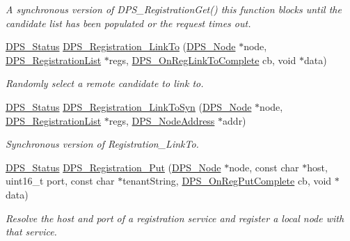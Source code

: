 \begin{DoxyCompactItemize}
\begin{DoxyCompactList}\small\item\em A synchronous version of D\+P\+S\+\_\+\+Registration\+Get() this function blocks until the candidate list has been populated or the request times out. \end{DoxyCompactList}\item 
\hyperlink{group__status_ga30395a84d3cad9d4ec29848106415038}{D\+P\+S\+\_\+\+Status} \hyperlink{group__registration_ga73550318aa9625aff612e549e9854e0c}{D\+P\+S\+\_\+\+Registration\+\_\+\+Link\+To} (\hyperlink{group__node_ga4dd612ab965134321bb57fdb065f121c}{D\+P\+S\+\_\+\+Node} $\ast$node, \hyperlink{group__registration_ga2b9489ff306ad253d24b03c418a6eda0}{D\+P\+S\+\_\+\+Registration\+List} $\ast$regs, \hyperlink{group__registration_gaaa0a8c9235e57aaf3e95dc3ecbf13c53}{D\+P\+S\+\_\+\+On\+Reg\+Link\+To\+Complete} cb, void $\ast$data)
\begin{DoxyCompactList}\small\item\em Randomly select a remote candidate to link to. \end{DoxyCompactList}\item 
\hyperlink{group__status_ga30395a84d3cad9d4ec29848106415038}{D\+P\+S\+\_\+\+Status} \hyperlink{group__registration_gab50e1fb04be97888ec759b1f0b3df1e6}{D\+P\+S\+\_\+\+Registration\+\_\+\+Link\+To\+Syn} (\hyperlink{group__node_ga4dd612ab965134321bb57fdb065f121c}{D\+P\+S\+\_\+\+Node} $\ast$node, \hyperlink{group__registration_ga2b9489ff306ad253d24b03c418a6eda0}{D\+P\+S\+\_\+\+Registration\+List} $\ast$regs, \hyperlink{group__nodeaddress_ga9e9f56aa38e82b4edcef7eb81e9f5bd2}{D\+P\+S\+\_\+\+Node\+Address} $\ast$addr)
\begin{DoxyCompactList}\small\item\em Synchronous version of Registration\+\_\+\+Link\+To. \end{DoxyCompactList}\item 
\hyperlink{group__status_ga30395a84d3cad9d4ec29848106415038}{D\+P\+S\+\_\+\+Status} \hyperlink{group__registration_gac412d38875c80431c558773a42ba0766}{D\+P\+S\+\_\+\+Registration\+\_\+\+Put} (\hyperlink{group__node_ga4dd612ab965134321bb57fdb065f121c}{D\+P\+S\+\_\+\+Node} $\ast$node, const char $\ast$host, uint16\+\_\+t port, const char $\ast$tenant\+String, \hyperlink{group__registration_ga8f1d316de08b7dea7dfe55ae814e0219}{D\+P\+S\+\_\+\+On\+Reg\+Put\+Complete} cb, void $\ast$data)
\begin{DoxyCompactList}\small\item\em Resolve the host and port of a registration service and register a local node with that service. \end{DoxyCompactList}\item 

\end{DoxyCompactItemize}
